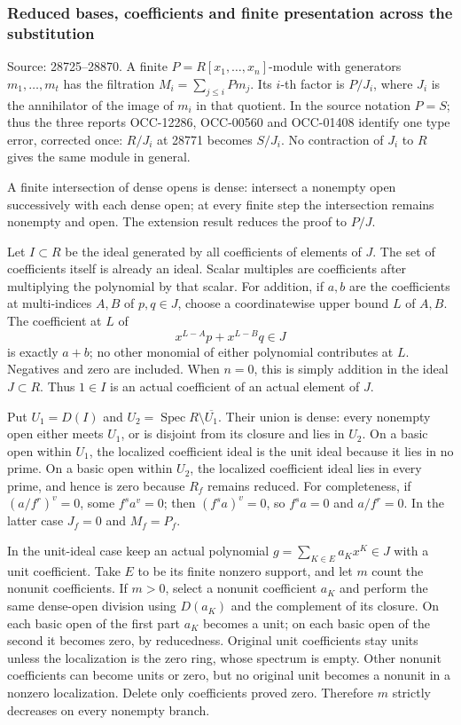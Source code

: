 \subsubsection{Reduced bases, coefficients and finite presentation across the substitution}\label{algebra-proof-027-reduced-bases-coefficients-and-finite-presentation-across-the-substitution}

Source: 28725--28870. A finite \(P=R[x_1,\ldots,x_n]\)-module with generators \(m_1,\ldots,m_t\) has the filtration \(M_i=\sum_{j\le i}Pm_j\). Its \(i\)-th factor is \(P/J_i\), where \(J_i\) is the annihilator of the image of \(m_i\) in that quotient. In the source notation \(P=S\); thus the three reports OCC-12286, OCC-00560 and OCC-01408 identify one type error, corrected once: \(R/J_i\) at 28771 becomes \(S/J_i\). No contraction of \(J_i\) to \(R\) gives the same module in general.

A finite intersection of dense opens is dense: intersect a nonempty open successively with each dense open; at every finite step the intersection remains nonempty and open. The extension result reduces the proof to \(P/J\).

Let \(I\subset R\) be the ideal generated by all coefficients of elements of \(J\). The set of coefficients itself is already an ideal. Scalar multiples are coefficients after multiplying the polynomial by that scalar. For addition, if \(a,b\) are the coefficients at multi-indices \(A,B\) of \(p,q\in J\), choose a coordinatewise upper bound \(L\) of \(A,B\). The coefficient at \(L\) of \[
 x^{L-A}p+x^{L-B}q\in J
\] is exactly \(a+b\); no other monomial of either polynomial contributes at \(L\). Negatives and zero are included. When \(n=0\), this is simply addition in the ideal \(J\subset R\). Thus \(1\in I\) is an actual coefficient of an actual element of \(J\).

Put \(U_1=D(I)\) and \(U_2=\operatorname{Spec}R\setminus\overline{U_1}\). Their union is dense: every nonempty open either meets \(U_1\), or is disjoint from its closure and lies in \(U_2\). On a basic open within \(U_1\), the localized coefficient ideal is the unit ideal because it lies in no prime. On a basic open within \(U_2\), the localized coefficient ideal lies in every prime, and hence is zero because \(R_f\) remains reduced. For completeness, if \((a/f^r)^v=0\), some \(f^s a^v=0\); then \((f^s a)^v=0\), so \(f^s a=0\) and \(a/f^r=0\). In the latter case \(J_f=0\) and \(M_f=P_f\).

In the unit-ideal case keep an actual polynomial \(g=\sum_{K\in E}a_Kx^K\in J\) with a unit coefficient. Take \(E\) to be its finite nonzero support, and let \(m\) count the nonunit coefficients. If \(m>0\), select a nonunit coefficient \(a_K\) and perform the same dense-open division using \(D(a_K)\) and the complement of its closure. On each basic open of the first part \(a_K\) becomes a unit; on each basic open of the second it becomes zero, by reducedness. Original unit coefficients stay units unless the localization is the zero ring, whose spectrum is empty. Other nonunit coefficients can become units or zero, but no original unit becomes a nonunit in a nonzero localization. Delete only coefficients proved zero. Therefore \(m\) strictly decreases on every nonempty branch.

